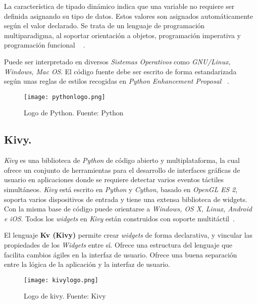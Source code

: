 La característica de tipado dinámico indica que una variable no requiere ser definida asignando su tipo de datos. Estos valores son asignados automáticamente según el valor declarado.
Se trata de un lenguaje de programación multiparadigma, al soportar orientación a objetos, programación imperativa y programación funcional ~\cite{Bahit} .

Puede ser interpretado en diversos \emph{Sistemas Operativos} como \emph{GNU/Linux, Windows, Mac OS}.
El código fuente debe ser escrito de forma estandarizada según unas reglas de estilos recogidas en \emph{Python Enhancement Proposal ~\cite{Proposal}}.

\begin{figure}[!h]
\begin{center}
\texttt{[image: pythonlogo.png]}
\caption{Logo de Python. Fuente: Python~\cite{Python}}
\label{fig:pythonlogo}
\end{center}
\end{figure}


\subsection{Kivy.}
\emph{Kivy} es una biblioteca de \emph{Python} de código abierto y multiplataforma, la cual ofrece un conjunto de herramientas para el desarrollo de interfaces gráficas de usuario en aplicaciones donde se requiere detectar varios eventos táctiles simultáneos.
\emph{Kivy} está escrito en \emph{Python} y \emph{Cython}, basado en \emph{OpenGL ES 2}, soporta varios dispositivos de entrada y tiene una extensa biblioteca de widgets. Con la misma base de código puede orientarse a \emph{Windows, OS X, Linux, Android e iOS}. Todos los \emph{widgets} en \emph{Kivy} están construidos con soporte multitáctil~\cite{Kivy}.

El lenguaje \textbf{Kv (Kivy)} permite crear \emph{widgets} de forma declarativa, y vincular las propiedades de los \emph{Widgets} entre sí. Ofrece una estructura del lenguaje que facilita cambios ágiles en la interfaz de usuario. Ofrece una buena separación entre la lógica de la aplicación y la interfaz de usuario.\\
\begin{figure}[!h]
\begin{center}
\texttt{[image: kivylogo.png]}
\caption{Logo de kivy. Fuente: Kivy ~\cite{Kivy}}
\label{fig:kivylogo}
\end{center}
\end{figure}

